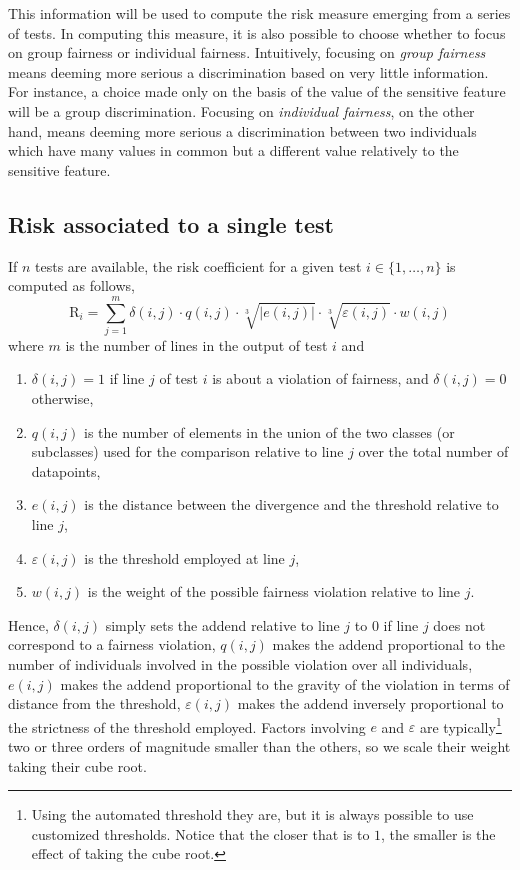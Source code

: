 \documentclass{article}
\begin{document}
This information will be used to compute the risk measure emerging from a series of tests. In computing this measure, it is also possible to choose whether to focus on group fairness or individual fairness. Intuitively, focusing on {\it group fairness} means deeming more serious a discrimination based on very little information. For instance, a choice made only on the basis of the value of the sensitive feature will be a group discrimination. Focusing on {\it individual fairness}, on the other hand, means deeming more serious a discrimination between two individuals which have many values in common but a different value relatively to the sensitive feature.

\subsection{Risk associated to a single test}\label{risk_single}
If $n$ tests are available, the risk coefficient for a given test $i\in\{1,\dots,n\}$ is computed as follows,
\[\mathrm{R}_i=\sum^m_{j=1} \delta (i,j)\cdot q(i,j)\cdot \sqrt[3]{|e(i,j)|}\cdot \sqrt[3]{\varepsilon (i,j)}\cdot w(i,j) \]where $m$ is the number of lines in the output of test $i$ and 
\begin{enumerate}
\item $\delta (i,j)=1 $ if line $j$ of test $i$ is about a violation of fairness, and $\delta (i,j)=0 $ otherwise,

\item $q(i,j)$ is the number of elements in the union of the two classes (or subclasses) used for the comparison relative to line $j$ over the total number of datapoints,

\item $e(i,j)$ is the distance between the divergence and the threshold relative to line $j$, 

\item $\varepsilon (i,j)$ is the threshold employed at line $j$,

\item $w(i,j)$ is the weight of the possible fairness violation relative to line $j$.
\end{enumerate}

Hence, $\delta (i,j)$ simply sets the addend relative to line $j$ to $0$ if line $j$ does not correspond to a fairness violation, $q(i,j)$ makes the addend proportional to the number of individuals involved in the possible violation over all individuals, $e(i,j)$ makes the addend proportional to the gravity of the violation in terms of distance from the threshold, $\varepsilon (i,j)$ makes the addend inversely proportional to the strictness of the threshold employed. Factors involving $e$ and $\varepsilon$ are typically\footnote{Using the automated threshold they are, but it is always possible to use customized thresholds. Notice that the closer that is to $1$, the smaller is the effect of taking the cube root.} two or three orders of magnitude smaller than the others, so we scale their weight taking their cube root.
\end{document}
